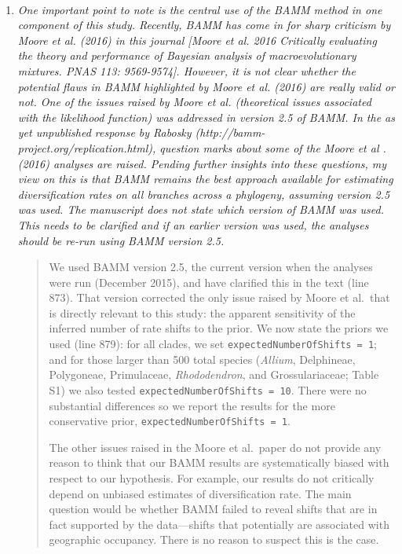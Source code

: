 \documentclass[11pt]{letter}
\begin{document}
\begin{letter}{ \\

}
\begin{enumerate}
  \begin{quote}
    We have added references to Donoghue \& Sanderson (2015) and
    Bouchenak-Khelladi et al.\ (2015), and clarified our point about
    \textit{Pedicularis} (lines 306, 308).
  \end{quote}

\item \textit{One important point to note is the central use of the
    BAMM method in one component of this study. Recently, BAMM has
    come in for sharp criticism by Moore et al. (2016) in this journal
    [Moore et al. 2016 Critically evaluating the theory and
    performance of Bayesian analysis of macroevolutionary
    mixtures. PNAS 113: 9569-9574]. However, it is not clear whether
    the potential flaws in BAMM highlighted by Moore et al. (2016) are
    really valid or not. One of the issues raised by Moore et
    al. (theoretical issues associated with the likelihood function)
    was addressed in version 2.5 of BAMM.  In the as yet unpublished
    response by Rabosky (http://bamm-project.org/replication.html),
    question marks about some of the Moore et al .(2016) analyses are
    raised.  Pending further insights into these questions, my view on
    this is that BAMM remains the best approach available for
    estimating diversification rates on all branches across a
    phylogeny, assuming version 2.5 was used. The manuscript does not
    state which version of BAMM was used. This needs to be clarified
    and if an earlier version was used, the analyses should be re-run
    using BAMM version 2.5.}

  \begin{quote}
    We used BAMM version 2.5, the current version when the analyses
    were run (December 2015), and have clarified this in the text
    (line 873). That version corrected the only issue raised by Moore
    et al.\ that is directly relevant to this study: the apparent
    sensitivity of the inferred number of rate shifts to the prior. We
    now state the priors we used (line 879): for all clades, we set
    \texttt{expectedNumberOfShifts = 1}; and for those larger than 500
    total species (\textit{Allium}, Delphineae, Polygoneae,
    Primulaceae, \textit{Rhododendron}, and Grossulariaceae; Table S1)
    we also tested \texttt{expectedNumberOfShifts = 10}. There were no
    substantial differences so we report the results for the more
    conservative prior, \texttt{expectedNumberOfShifts = 1}.

    The other issues raised in the Moore et al.\ paper do not provide
    any reason to think that our BAMM results are systematically
    biased with respect to our hypothesis. For example, our results do
    not critically depend on unbiased estimates of diversification
    rate. The main question would be whether BAMM failed to reveal
    shifts that are in fact supported by the data---shifts that
    potentially are associated with geographic occupancy. There is no
    reason to suspect this is the case.


\end{quote}
\end{enumerate}
\end{letter}
\end{document}
